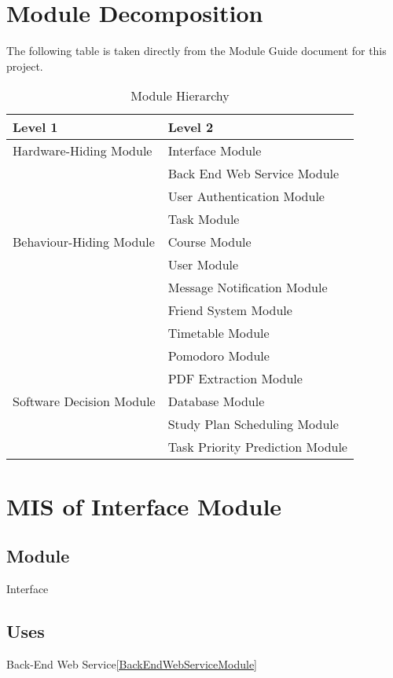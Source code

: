 \documentclass[12pt, titlepage]{article}
\begin{document}
\section{Module Decomposition}

The following table is taken directly from the Module Guide document for this project.

\begin{table}[h!]
\centering
\begin{tabular}{p{} p{}}
\toprule
\textbf{Level 1} & \textbf{Level 2}\\
\midrule

{Hardware-Hiding Module} & Interface Module\\
\midrule

\multirow{7}{0.3\textwidth}{Behaviour-Hiding Module}
& Back End Web Service Module\\
& User Authentication Module\\ 
& Task Module\\
& Course Module\\
& User Module\\
& Message Notification Module\\ 
& Friend System Module\\ 
& Timetable Module\\ 
& Pomodoro Module\\
\midrule

\multirow{3}{0.3\textwidth}{Software Decision Module}
& PDF Extraction Module \\
& Database Module\\
& Study Plan Scheduling Module \\
& Task Priority Prediction Module \\

\bottomrule

\end{tabular}
\caption{Module Hierarchy}
\label{TblMH}
\end{table}


\newpage
\section{MIS of Interface Module} \label{InterfaceModule}

\subsection{Module}
Interface

\subsection{Uses}
Back-End Web Service\ref{BackEndWebServiceModule}
\end{document}
